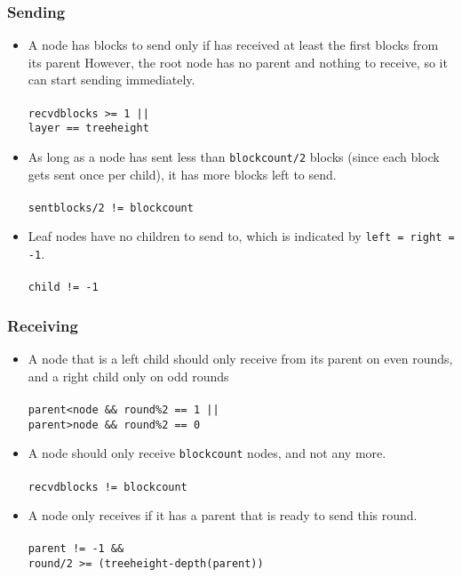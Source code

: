 \documentclass[twoside,twocolumn,hidelinks]{article}
\begin{document}
\subsubsection{Sending}
\begin{itemize}
      \item A node has blocks to send only if has received at least the first blocks from its parent However, the root node has no parent and nothing to receive, so it can start sending immediately.\\\\
      \texttt{recvdblocks >= 1 || \\ layer == treeheight}\\
      \item As long as a node has sent less than \texttt{blockcount/2} blocks (since each block gets sent once per child), it has more blocks left to send. \\\\
      \texttt{sentblocks/2 != blockcount}\\
      \item Leaf nodes have no children to send to, which is indicated by \texttt{left = right = -1}. \\\\
      \texttt{child != -1}
\end{itemize}

\subsubsection{Receiving}
\begin{itemize}
      \item A node that is a left child should only receive from its parent on even rounds, and a right child only on odd rounds \\\\
      \texttt{parent<node \&\& round\%2 == 1 || \\parent>node \&\& round\%2 == 0}\\
      \item A node should only receive \texttt{blockcount} nodes, and not any more. \\\\
      \texttt{recvdblocks != blockcount}\\
      \item A node only receives if it has a parent that is ready to send this round. \\\\
      \texttt{parent != -1 \&\& \\round/2 >= (treeheight-depth(parent))}\\
\end{itemize}
\end{document}
